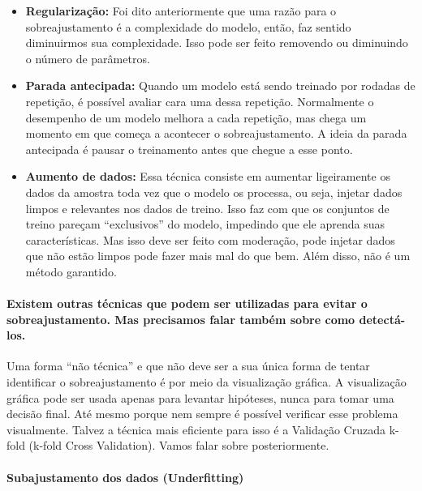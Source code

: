 \documentclass[
  letterpaper,
  DIV=11,
  numbers=noendperiod]{scrreprt}
\let\oldparagraph\paragraph
\renewcommand{\paragraph}[1]{\oldparagraph{#1}\mbox{}}
\begin{document}
\begin{itemize}
\item
  \textbf{Regularização:} Foi dito anteriormente que uma razão para o
  sobreajustamento é a complexidade do modelo, então, faz sentido
  diminuirmos sua complexidade. Isso pode ser feito removendo ou
  diminuindo o número de parâmetros.
\item
  \textbf{Parada antecipada:} Quando um modelo está sendo treinado por
  rodadas de repetição, é possível avaliar cara uma dessa repetição.
  Normalmente o desempenho de um modelo melhora a cada repetição, mas
  chega um momento em que começa a acontecer o sobreajustamento. A ideia
  da parada antecipada é pausar o treinamento antes que chegue a esse
  ponto.
\item
  \textbf{Aumento de dados:} Essa técnica consiste em aumentar
  ligeiramente os dados da amostra toda vez que o modelo os processa, ou
  seja, injetar dados limpos e relevantes nos dados de treino. Isso faz
  com que os conjuntos de treino pareçam ``exclusivos'' do modelo,
  impedindo que ele aprenda suas características. Mas isso deve ser
  feito com moderação, pode injetar dados que não estão limpos pode
  fazer mais mal do que bem. Além disso, não é um método garantido.
\end{itemize}

\hypertarget{existem-outras-tuxe9cnicas-que-podem-ser-utilizadas-para-evitar-o-sobreajustamento.-mas-precisamos-falar-tambuxe9m-sobre-como-detectuxe1-los.}{%
\paragraph{Existem outras técnicas que podem ser utilizadas para evitar
o sobreajustamento. Mas precisamos falar também sobre como
detectá-los.}\label{existem-outras-tuxe9cnicas-que-podem-ser-utilizadas-para-evitar-o-sobreajustamento.-mas-precisamos-falar-tambuxe9m-sobre-como-detectuxe1-los.}}

Uma forma ``não técnica'' e que não deve ser a sua única forma de tentar
identificar o sobreajustamento é por meio da visualização gráfica. A
visualização gráfica pode ser usada apenas para levantar hipóteses,
nunca para tomar uma decisão final. Até mesmo porque nem sempre é
possível verificar esse problema visualmente. Talvez a técnica mais
eficiente para isso é a Validação Cruzada k-fold (k-fold Cross
Validation). Vamos falar sobre posteriormente.

\hypertarget{subajustamento-dos-dados-underfitting}{%
\paragraph{\texorpdfstring{Subajustamento dos dados
(\textbf{Underfitting})}{Subajustamento dos dados (Underfitting)}}\label{subajustamento-dos-dados-underfitting}}
\end{document}
